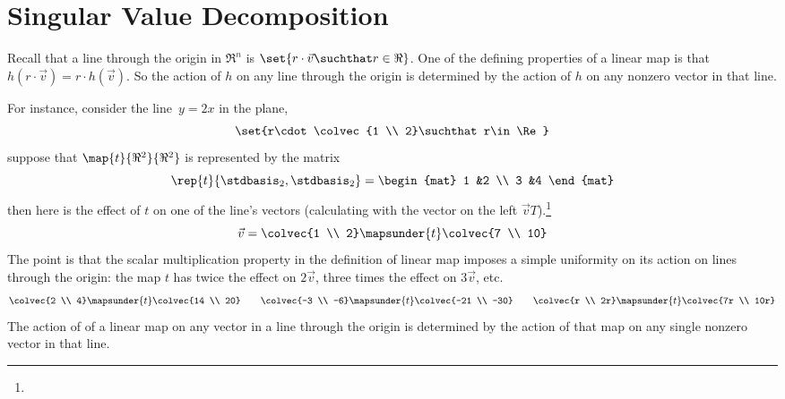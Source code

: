 \chapter{Singular Value Decomposition}
\label{chap:SingularValueDecomposition}

Recall that a line through the origin in $\Re^n$ is 
$\set{r\cdot \vec{v}\suchthat r\in\Re}$. 
One of the defining properties of a linear map is that 
$h(r\cdot\vec{v})=r\cdot h(\vec{v})$.
So the action of $h$ on any 
line through the origin
is determined by the action
of $h$ on any nonzero vector in that line.

For instance, consider the line~$y=2x$ in the plane,
\begin{equation*}
  \set{r\cdot\colvec{1 \\ 2}\suchthat r\in\Re}
\end{equation*}
suppose that $\map{t}{\Re^2}{\Re^2}$ is represented by the matrix
\begin{equation*}
  \rep{t}{\stdbasis_2,\stdbasis_2}
  =
  \begin{mat}
    1 &2 \\
    3 &4
  \end{mat}
\end{equation*}
then here is the effect of $t$ on one of the line's vectors
(calculating with the vector on the left $\vec{v}T$).\footnote{\noterightmult}
\begin{equation*}
  \vec{v}=\colvec{1 \\ 2}\mapsunder{t}\colvec{7 \\ 10}
\end{equation*}
The point is that the 
scalar multiplication property in the definition of linear map 
imposes a simple
uniformity on its action on lines through the origin:
the map $t$ has twice the effect on $2\vec{v}$, three times the
effect on $3\vec{v}$, etc.
\begin{equation*}
  \colvec{2 \\ 4}\mapsunder{t}\colvec{14 \\ 20}
  \qquad
  \colvec{-3 \\ -6}\mapsunder{t}\colvec{-21 \\ -30}
  \qquad
  \colvec{r \\ 2r}\mapsunder{t}\colvec{7r \\ 10r}
\end{equation*}
The action of of a linear map on any vector in a 
line through the origin
is determined by the action
of that map on any single nonzero vector in that line.



